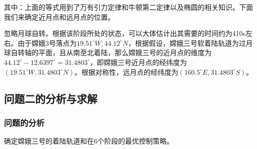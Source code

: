             其中：上面的等式用到了万有引力定律和牛顿第二定律以及椭圆的相关知识。下面我们来确定近月点和远月点的位置。
            \par
            忽略月球自转。根据该阶段所处的状态，可以大体估计出其需要的时间约为410s左右。由于嫦娥3号落点为$19.51^\circ W,44.12^\circ N$，根据假设，嫦娥三号软着陆轨道为过月球自转轴的平面，且从南至北着陆，那么嫦娥三号的近月点的维度为$44.12^\circ -12.6397^\circ = 31.4803^\circ$，即嫦娥三号近月点的经纬度为$(19.51^\circ W,31.4803^\circ N)$。根据对称性，远月点的经纬度为$(160.5^\circ E,31.4803^\circ S)$。

    \subsection{问题二的分析与求解}
        \subsubsection{问题的分析}
            \par
            确定嫦娥三号的着陆轨道和在6个阶段的最优控制策略。
